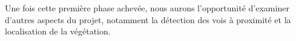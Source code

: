 \noindent Une fois cette première phase achevée, nous aurons l'opportunité d'examiner d'autres aspects du projet, notamment la détection des vois à proximité et la localisation de la végétation. 






